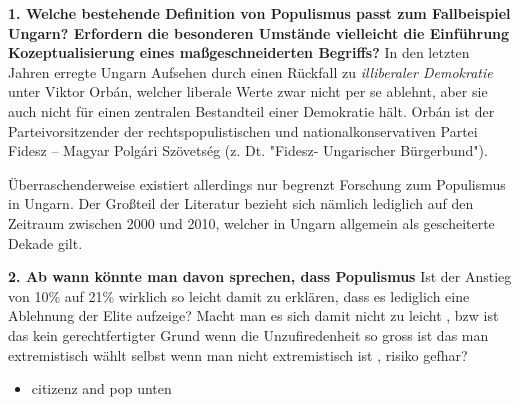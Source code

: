 \documentclass[11pt]{article}
\date{\today}
\title{}
\begin{document}
\tableofcontents

\textbf{1. Welche bestehende Definition von Populismus passt zum Fallbeispiel Ungarn? Erfordern die besonderen Umstände vielleicht die Einführung Kozeptualisierung eines maßgeschneiderten Begriffs?}
In den letzten Jahren erregte Ungarn Aufsehen durch einen Rückfall zu \emph{illiberaler Demokratie} unter Viktor Orbán, welcher liberale Werte zwar nicht per se ablehnt, aber sie auch nicht für einen zentralen Bestandteil einer Demokratie hält. Orbán ist der Parteivorsitzender der rechtspopulistischen und nationalkonservativen Partei Fidesz – Magyar Polgári Szövetség (z. Dt. "Fidesz- Ungarischer Bürgerbund").

Überraschenderweise existiert allerdings nur begrenzt Forschung zum Populismus in Ungarn. Der Großteil der Literatur bezieht sich nämlich lediglich auf den Zeitraum zwischen 2000 und 2010, welcher in Ungarn allgemein als gescheiterte Dekade gilt.

\textbf{2. Ab wann könnte man davon sprechen, dass Populismus} 
Ist der Anstieg von 10\% auf 21\% wirklich so leicht damit zu erklären, dass es lediglich eine Ablehnung der Elite aufzeige? Macht man es sich damit nicht zu leicht , bzw ist das kein gerechtfertigter Grund wenn die Unzufiredenheit so gross ist das man extremistisch wählt selbst wenn man nicht extremistisch ist , risiko gefhar?
\begin{itemize}
\item citizenz and pop unten
\end{itemize}
\end{document}
